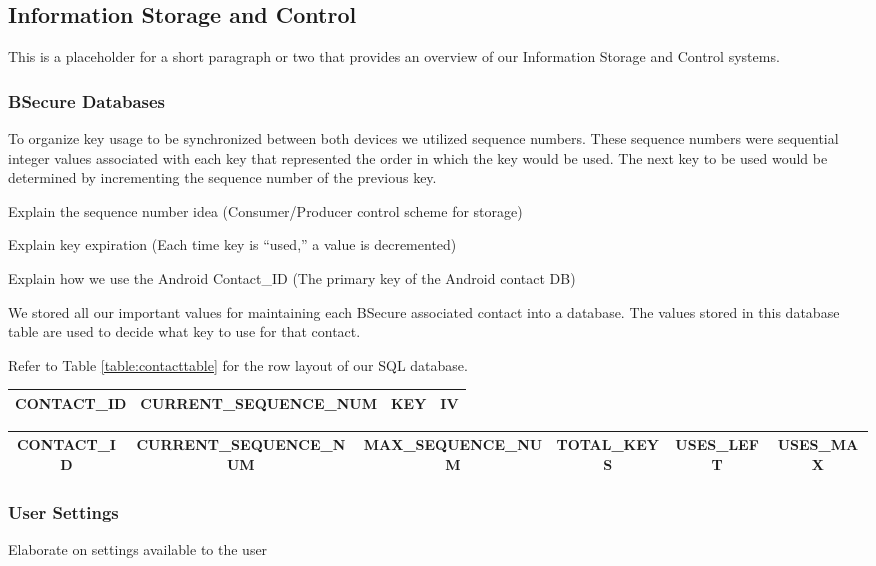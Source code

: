 \subsection{Information Storage and Control}
This is a placeholder for a short paragraph or two that provides an overview of our Information Storage and Control systems.

\subsubsection{BSecure Databases}
To organize key usage to be synchronized between both devices we utilized sequence numbers.
These sequence numbers were sequential integer values associated with each key that represented the
order in which the key would be used. The next key to be used would be determined by incrementing the sequence
number of the previous key.

Explain the sequence number idea (Consumer/Producer control scheme for storage)

Explain key expiration (Each time key is ``used,'' a value is decremented)

Explain how we use the Android Contact\_ID (The primary key of the Android contact DB)

We stored all our important values for maintaining each BSecure associated contact
into a database. The values stored in this database table are used to decide what key to use for that
contact.

Refer to Table \ref{table:contacttable} for the row layout of our SQL database.

\begin{table*}
\centering
\caption{Key Table Design}
\label{table:contacttable}
\begin{tabular}{|c|c|c|c|} \hline
CONTACT\_ID&CURRENT\_SEQUENCE\_NUM&KEY&IV\\ \hline\end{tabular}
\end{table*}

\begin{table*}
\centering
\caption{Contact Table Design}
\label{table:contacttable}
\begin{tabular}{|c|c|c|c|c|c|} \hline
CONTACT\_ID&CURRENT\_SEQUENCE\_NUM&MAX\_SEQUENCE\_NUM&TOTAL\_KEYS&USES\_LEFT&USES\_MAX\\ \hline\end{tabular}
\end{table*}


\subsubsection{User Settings}
Elaborate on settings available to the user

